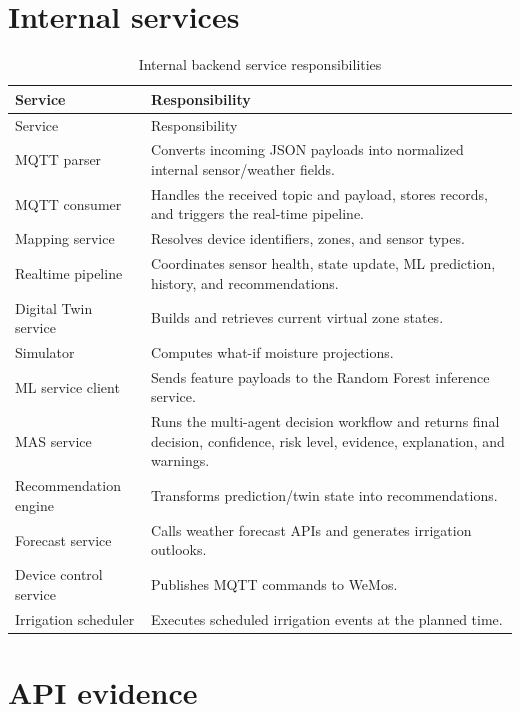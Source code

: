 \section{Internal services}

\begin{footnotesize}
\setlength{\tabcolsep}{2pt}
\begin{longtable}{@{}>{\raggedright\arraybackslash}p{}>{\raggedright\arraybackslash}p{}@{}}
\caption{Internal backend service responsibilities}\\
\toprule
Service & Responsibility \\
\midrule
\endfirsthead
\toprule
Service & Responsibility \\
\midrule
\endhead
MQTT parser & Converts incoming JSON payloads into normalized internal sensor/weather fields. \\
MQTT consumer & Handles the received topic and payload, stores records, and triggers the real-time pipeline. \\
Mapping service & Resolves device identifiers, zones, and sensor types. \\
Realtime pipeline & Coordinates sensor health, state update, ML prediction, history, and recommendations. \\
Digital Twin service & Builds and retrieves current virtual zone states. \\
Simulator & Computes what-if moisture projections. \\
ML service client & Sends feature payloads to the Random Forest inference service. \\
MAS service & Runs the multi-agent decision workflow and returns final decision, confidence, risk level, evidence, explanation, and warnings. \\
Recommendation engine & Transforms prediction/twin state into recommendations. \\
Forecast service & Calls weather forecast APIs and generates irrigation outlooks. \\
Device control service & Publishes MQTT commands to WeMos. \\
Irrigation scheduler & Executes scheduled irrigation events at the planned time. \\
\bottomrule
\end{longtable}
\end{footnotesize}

\section{API evidence}

